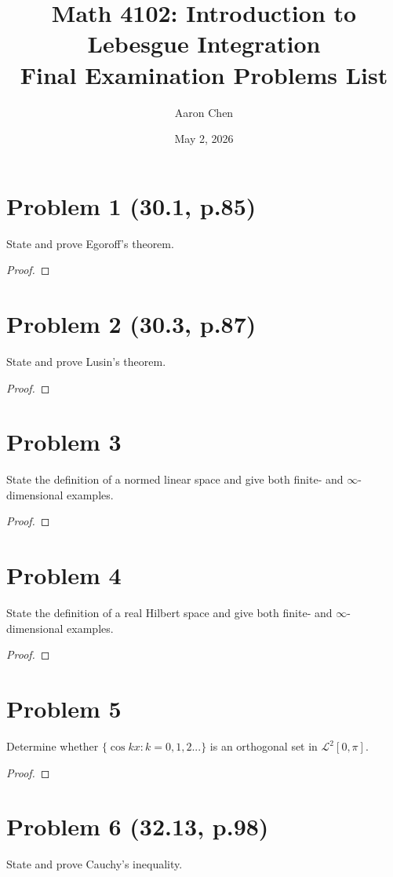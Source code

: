 \documentclass[12pt]{article}
\title{Math 4102: Introduction to Lebesgue Integration \\ Final Examination Problems List}
\author{Aaron Chen}
\date{May 2, 2026}
\begin{document}
\maketitle

\section*{Problem 1 (30.1, p.85)}
State and prove Egoroff's theorem.

\begin{proof}
\end{proof}

\section*{Problem 2 (30.3, p.87)}
State and prove Lusin's theorem.

\begin{proof}
\end{proof}

\section*{Problem 3}
State the definition of a normed linear space and give both finite- and $\infty$-dimensional examples.

\begin{proof}
\end{proof}

\section*{Problem 4}
State the definition of a real Hilbert space and give both finite- and $\infty$-dimensional examples.

\begin{proof}
\end{proof}

\section*{Problem 5}
Determine whether $\{\cos kx : k=0,1,2...\}$ is an orthogonal set in $\mathcal{L}^{2}[0,\pi]$.

\begin{proof}
\end{proof}

\section*{Problem 6 (32.13, p.98)}
State and prove Cauchy's inequality.
\end{document}
